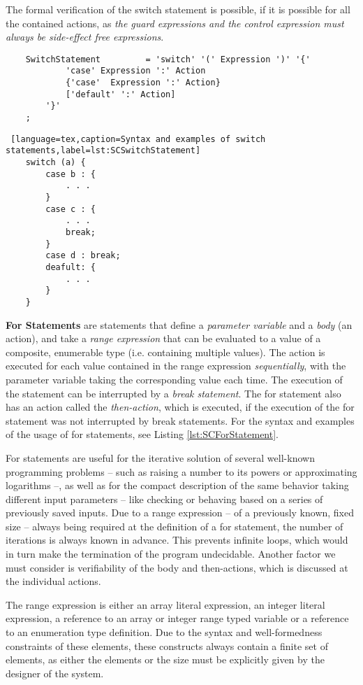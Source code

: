 The formal verification of the switch statement is possible, if it is possible for all the contained actions, as \textit{the guard expressions and the control expression must always be side-effect free expressions}.
\bigskip
\begin{lstlisting}
	SwitchStatement 		= 'switch' '(' Expression ')' '{'
			'case' Expression ':' Action
			{'case'  Expression ':' Action}
			['default' ':' Action]
		'}'	
	;
\end{lstlisting}
\begin{lstlisting} [language=tex,caption=Syntax and examples of switch statements,label=lst:SCSwitchStatement]
	switch (a) {
		case b : {		
			. . .
		}
		case c : {		
			. . .
			break;
		}
		case d : break;	
		deafult: {		
			. . .
		}
	}
\end{lstlisting}

\bigskip
\textbf{For Statements} are statements that define a \textit{parameter variable} and a \textit{body} (an action), and take a \textit{range expression} that can be evaluated to a value of a composite, enumerable type (i.e. containing multiple values). The action is executed for each value contained in the range expression \textit{sequentially}, with the parameter variable taking the corresponding value each time. The execution of the statement can be interrupted by a \textit{break statement}. The for statement also has an action called the \textit{then-action}, which is executed, if the execution of the for statement was not interrupted by break statements. For the syntax and examples of the usage of for statements, see Listing \ref{lst:SCForStatement}.

For statements are useful for the iterative solution of several well-known programming problems -- such as raising a number to its powers or approximating logarithms --, as well as for the compact description of the same behavior taking different input parameters -- like checking or behaving based on a series of previously saved inputs.
Due to a range expression -- of a previously known, fixed size -- always being required at the definition of a for statement, the number of iterations is always known in advance. This prevents infinite loops, which would in turn make the termination of the program undecidable. Another factor we must consider is verifiability of the body and then-actions, which is discussed at the individual actions.

The range expression is either an array literal expression, an integer literal expression, a reference to an array or integer range typed variable or a reference to an enumeration type definition. Due to the syntax and well-formedness constraints of these elements, these constructs always contain a finite set of elements, as either the elements or the size must be explicitly given by the designer of the system. 

